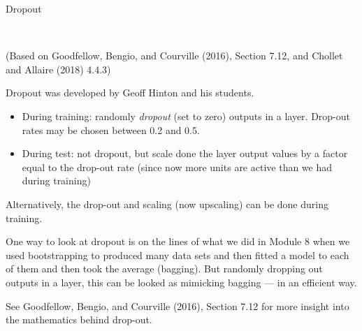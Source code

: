 \documentclass[10pt,ignorenonframetext,]{beamer}
\providecommand{\tightlist}{%
  \setlength{\itemsep}{0pt}\setlength{\parskip}{0pt}}
\begin{document}
\begin{frame}

\begin{block}{Dropout}

\(~\)

(Based on Goodfellow, Bengio, and Courville (2016), Section 7.12, and
Chollet and Allaire (2018) 4.4.3)

Dropout was developed by Geoff Hinton and his students.

\begin{itemize}
\tightlist
\item
  During training: randomly \emph{dropout} (set to zero) outputs in a
  layer. Drop-out rates may be chosen between 0.2 and 0.5.
\item
  During test: not dropout, but scale done the layer output values by a
  factor equal to the drop-out rate (since now more units are active
  than we had during training)
\end{itemize}

Alternatively, the drop-out and scaling (now upscaling) can be done
during training.

\end{block}

\end{frame}

\begin{frame}

One way to look at dropout is on the lines of what we did in Module 8
when we used bootstrapping to produced many data sets and then fitted a
model to each of them and then took the average (bagging). But randomly
dropping out outputs in a layer, this can be looked as mimicking bagging
--- in an efficient way.

See Goodfellow, Bengio, and Courville (2016), Section 7.12 for more
insight into the mathematics behind drop-out.

\end{frame}
\end{document}
